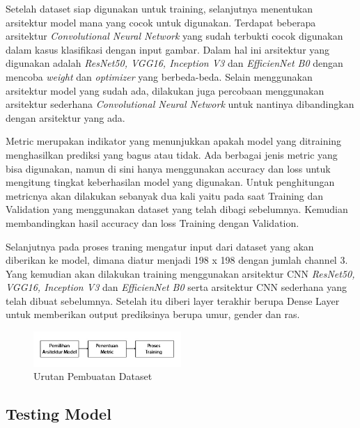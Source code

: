 Setelah dataset siap digunakan untuk training, selanjutnya menentukan arsitektur model mana yang cocok untuk digunakan.
Terdapat beberapa arsitektur \textit{Convolutional Neural Network} yang sudah terbukti cocok digunakan dalam kasus 
klasifikasi dengan input gambar. Dalam hal ini arsitektur yang digunakan adalah \textit{ResNet50, VGG16, Inception V3} dan \textit{EfficienNet B0} 
dengan mencoba \textit{weight} dan \textit{optimizer} yang berbeda-beda. Selain menggunakan arsitektur model yang sudah ada, dilakukan 
juga percobaan menggunakan arsitektur sederhana \textit{Convolutional Neural Network} untuk nantinya dibandingkan dengan arsitektur 
yang ada. \par

Metric merupakan indikator yang menunjukkan apakah model yang ditraining menghasilkan prediksi yang bagus atau tidak. Ada berbagai jenis 
metric yang bisa digunakan, namun di sini hanya menggunakan accuracy dan loss untuk mengitung tingkat keberhasilan model yang digunakan. 
Untuk penghitungan metricnya akan dilakukan sebanyak dua kali yaitu pada saat Training dan Validation yang menggunakan dataset yang telah 
dibagi sebelumnya. Kemudian membandingkan hasil accuracy dan loss Training dengan Validation. \par

Selanjutnya pada proses traning mengatur input dari dataset yang akan diberikan ke model, dimana diatur menjadi 198 x 198 dengan jumlah channel 3. 
Yang kemudian akan dilakukan training menggunakan arsitektur CNN \textit{ResNet50, VGG16, Inception V3} dan \textit{EfficienNet B0} serta arsitektur CNN 
sederhana yang telah dibuat sebelumnya. Setelah itu diberi layer terakhir berupa Dense Layer untuk memberikan output prediksinya berupa 
umur, gender dan ras. 

\begin{figure} [ht]
  \centering
  \includegraphics[width=0.5\textwidth]{gambar/model.jpg}

  \caption{Urutan Pembuatan Dataset}
  \label{fig:model}
\end{figure}

\subsection{Testing Model}
\label{subsec:testing}

